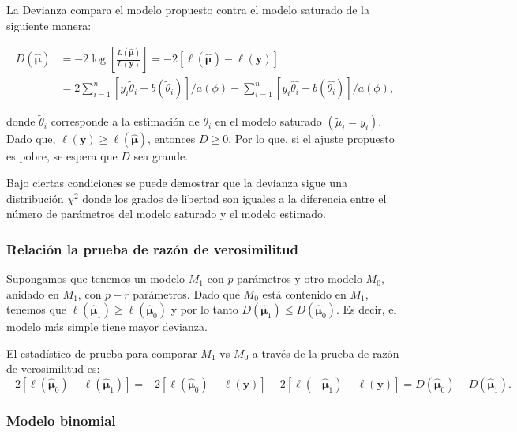 \documentclass[
]{article}
\begin{document}
La Devianza compara el modelo propuesto contra el modelo saturado de la siguiente manera:

\begin{equation}
\begin{split}
D(\widehat{\boldsymbol \mu}) &=- 2 \log \left[ \frac{L(\widehat{\boldsymbol \mu})}{L(\boldsymbol y)} \right] = -2[\ell(\hat{\boldsymbol \mu})-\ell(\boldsymbol y)] \\
&=  2\sum_{i=1}^n[y_i\widetilde{\theta}_i-b(\widetilde{\theta}_i)]/a(\phi) - \sum_{i=1}^n[y_i\widehat{\theta_i}-b(\widehat{\theta_i})]/a(\phi),
\end{split}
\nonumber
\end{equation}

donde \(\widetilde{\theta}_i\) corresponde a la estimación de \(\theta_i\) en el modelo saturado \((\widetilde{\mu}_i=y_i)\). Dado que, \(\ell(\boldsymbol y) \geq \ell(\widehat{\boldsymbol \mu})\), entonces \(D \geq 0\). Por lo que, si el ajuste propuesto es pobre, se espera que \(D\) sea grande.

Bajo ciertas condiciones se puede demostrar que la devianza sigue una distribución \(\chi^2\) donde los grados de libertad son iguales a la diferencia entre el número de parámetros del modelo saturado y el modelo estimado.

\subsubsection{Relación la prueba de razón de verosimilitud}\label{relaciuxf3n-la-prueba-de-razuxf3n-de-verosimilitud}

Supongamos que tenemos un modelo \(M_1\) con \(p\) parámetros y otro modelo \(M_0\), anidado en \(M_1\), con \(p-r\) parámetros. Dado que \(M_0\) está contenido en \(M_1\), tenemos que \(\ell(\widehat{\boldsymbol \mu}_1) \geq \ell(\widehat{\boldsymbol \mu}_0)\) y por lo tanto \(D(\widehat{\boldsymbol \mu}_1) \leq D(\widehat{\boldsymbol \mu}_0)\). Es decir, el modelo más simple tiene mayor devianza.

El estadístico de prueba para comparar \(M_1\) vs \(M_0\) a través de la prueba de razón de verosimilitud es:
\[
- 2 [\ell(\widehat{\boldsymbol \mu}_0)-\ell(\widehat{\boldsymbol \mu}_1)] = -2[ \ell(\widehat{\boldsymbol \mu}_0) - \ell(\boldsymbol y) ] -2[ \ell(-\widehat{\boldsymbol \mu}_1) - \ell(\boldsymbol y) ] = D(\widehat{\boldsymbol \mu}_0) - D(\widehat{\boldsymbol \mu}_1).
\]

\subsubsection{Modelo binomial}\label{modelo-binomial}
\end{document}

